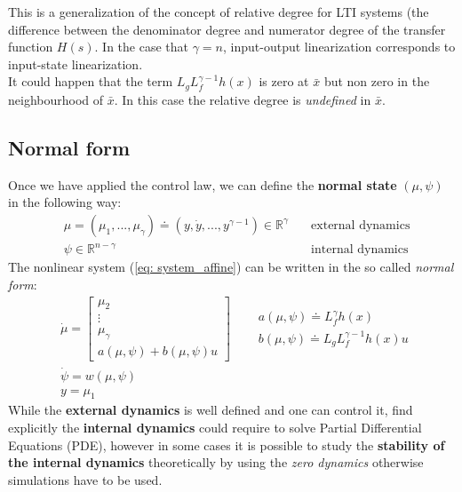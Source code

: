  This is a generalization of the concept of relative degree for LTI systems (the difference between the denominator degree and numerator degree of the transfer function $H(s).$
 In the case that $\gamma=n$, input-output linearization corresponds to input-state linearization.\\
 It could happen that the term $L_gL_f^{\gamma-1}h(x)$ is zero at $\bar{x}$ but non zero in the neighbourhood of $\bar{x}$.
 In this case the relative degree is \textit{undefined} in $\bar{x}$.
 
 \subsection{Normal form}
Once we have applied the control law, we can define the \textbf{normal state} $(\mu,\psi)$ in the following way:
\begin{align}
    &\mu=(\mu_1, ..., \mu_\gamma)\doteq (y, \dot{y},..., y^{\gamma-1})\in\mathbb{R}^{\gamma} \quad & \text{external dynamics}\\
    &\psi\in\mathbb{R}^{n-\gamma} & \text{internal dynamics}
\end{align}
The nonlinear system (\ref{eq: system_affine}) can be written in the so called \textit{normal form}:
\begin{equation}
    \begin{aligned}
        &\dot{\mu}=\begin{bmatrix}
            \mu_2\\
            \vdots\\
            \mu_\gamma\\
            a(\mu, \psi)+b(\mu,\psi)u
        \end{bmatrix} \quad \begin{matrix}
            &a(\mu, \psi)\doteq L_f^{\gamma}h(x)\\
            &b(\mu, \psi)\doteq L_gL_f^{\gamma-1}h(x)u
        \end{matrix}\\
        &\dot{\psi}=w(\mu,\psi)\\
        &y=\mu_1
    \end{aligned}
\end{equation}
While the \textbf{external dynamics} is well defined and one can control it, find explicitly the \textbf{internal dynamics} could require to solve Partial Differential Equations (PDE), however in some cases it is possible to study the \textbf{stability of the internal dynamics} theoretically by using the \textit{zero dynamics} otherwise simulations have to be used.
 
